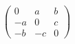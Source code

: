 \documentclass{article}
\begin{document}
\[
\begin{pmatrix} 0 & a & b \\ -a & 0 & c \\ -b & -c & 0 \end{pmatrix}
\]
\end{document}
